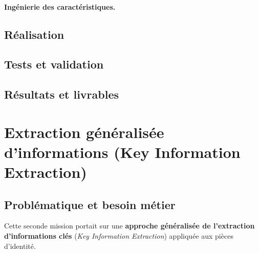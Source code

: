 \paragraph{Ingénierie des caractéristiques.}

\subsection{Réalisation}

\subsection{Tests et validation}

\subsection{Résultats et livrables}

\section{Extraction généralisée d'informations (Key Information Extraction)}

\subsection{Problématique et besoin métier}
Cette seconde mission portait sur une \textbf{approche généralisée de l'extraction
d'informations clés} (\emph{Key Information Extraction}) appliquée aux pièces
d'identité.

